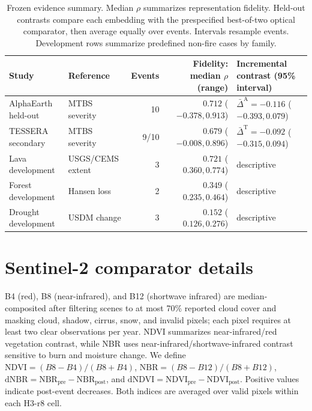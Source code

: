 \documentclass{article}
\begin{document}
\begin{table}[ht]
  \caption{Frozen evidence summary. Median $\rho$ summarizes representation
  fidelity. Held-out contrasts compare each embedding with the prespecified
  best-of-two optical comparator, then average equally over events. Intervals
  resample events. Development rows summarize predefined non-fire cases by
  family.}
  \label{tab:results}
  \centering
  \footnotesize
  \setlength{\tabcolsep}{4.0pt}
  \begin{tabular}{@{}llrrl@{}}
    \toprule
    Study & Reference & Events & Fidelity: median $\rho$ (range) &
    Incremental contrast (95\% interval) \\
    \midrule
    AlphaEarth held-out
      & MTBS severity
      & 10
      & $0.712$ ($-0.378,0.913$)
      & $\bar{\Delta}^{\mathrm{A}}=-0.116$ ($-0.393,0.079$) \\
    TESSERA secondary
      & MTBS severity
      & 9/10
      & $0.679$ ($-0.008,0.896$)
      & $\bar{\Delta}^{\mathrm{T}}=-0.092$ ($-0.315,0.094$) \\
    Lava development
      & USGS/CEMS extent
      & 3
      & $0.721$ ($0.360,0.774$)
      & descriptive \\
    Forest development
      & Hansen loss
      & 2
      & $0.349$ ($0.235,0.464$)
      & descriptive \\
    Drought development
      & USDM change
      & 3
      & $0.152$ ($0.126,0.276$)
      & descriptive \\
    \bottomrule
  \end{tabular}
\end{table}

\section{Sentinel-2 comparator details}
\label{app:s2}

B4 (red), B8 (near-infrared), and B12 (shortwave infrared) are
median-composited after filtering scenes to at most 70\% reported cloud cover
and masking cloud, shadow, cirrus, snow, and invalid pixels; each pixel
requires at least two clear observations per year. NDVI summarizes
near-infrared/red vegetation contrast, while NBR uses
near-infrared/shortwave-infrared contrast sensitive to burn and moisture
change. We define
$\mathrm{NDVI}=(B8-B4)/(B8+B4)$,
$\mathrm{NBR}=(B8-B12)/(B8+B12)$,
$\mathrm{dNBR}=\mathrm{NBR}_{\mathrm{pre}}-\mathrm{NBR}_{\mathrm{post}}$, and
$\mathrm{dNDVI}=\mathrm{NDVI}_{\mathrm{pre}}-\mathrm{NDVI}_{\mathrm{post}}$.
Positive values indicate post-event decreases. Both indices are averaged over
valid pixels within each H3-r8 cell.
\end{document}
